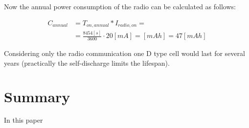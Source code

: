 \documentclass[conference]{IEEEtran}
\begin{document}
Now the annual power consumption of the radio can be calculated as
follows:

\begin{eqnarray}
    C_{annual} &= T_{on,annual} * I_{radio,on} = \\
     &= \frac{8454 [s]}{3600} \cdot 20 [mA] = [mAh] = 47 [mAh]
\end{eqnarray}

Considering only the radio communication one D type cell would last for
several years (practically the self-discharge limits the lifespan).

\section{Summary}

In this paper 



\end{document}
